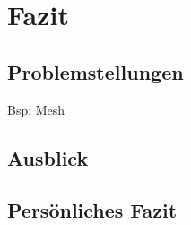 \chapter{Fazit}

\section{Problemstellungen}
Bsp: Mesh

\section{Ausblick}

\section{Persönliches Fazit}